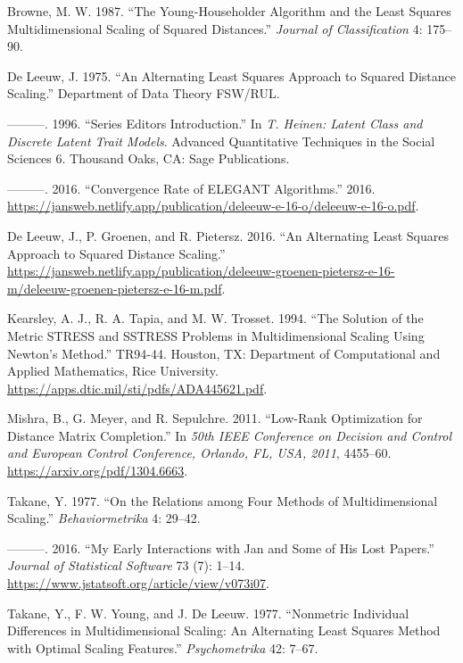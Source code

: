\documentclass[
  12pt,
  letterpaper,
  DIV=11,
  numbers=noendperiod]{scrartcl}
\newlength{\cslhangindent}
\newenvironment{CSLReferences}[2] %
 {\begin{list}{}{%
  \setlength{\itemindent}{0pt}
  \setlength{\leftmargin}{0pt}
  \setlength{\parsep}{0pt}
  \ifodd #1
   \setlength{\leftmargin}{\cslhangindent}
   \setlength{\itemindent}{-1\cslhangindent}
  \fi
  \setlength{\itemsep}{#2\baselineskip}}}
 {\end{list}}
\begin{document}
\label{refs}
\begin{CSLReferences}{1}{0}
Browne, M. W. 1987. {``{The Young-Householder Algorithm and the Least
Squares Multidimensional Scaling of Squared Distances}.''} \emph{Journal
of Classification} 4: 175--90.

De Leeuw, J. 1975. {``{An Alternating Least Squares Approach to Squared
Distance Scaling}.''} Department of Data Theory FSW/RUL.

---------. 1996. {``{Series Editors Introduction}.''} In \emph{{T.
Heinen: Latent Class and Discrete Latent Trait Models}}. Advanced
Quantitative Techniques in the Social Sciences 6. Thousand Oaks, CA:
Sage Publications.

---------. 2016. {``Convergence Rate of {ELEGANT} Algorithms.''} 2016.
\url{https://jansweb.netlify.app/publication/deleeuw-e-16-o/deleeuw-e-16-o.pdf}.

De Leeuw, J., P. Groenen, and R. Pietersz. 2016. {``An Alternating Least
Squares Approach to Squared Distance Scaling.''}
\url{https://jansweb.netlify.app/publication/deleeuw-groenen-pietersz-e-16-m/deleeuw-groenen-pietersz-e-16-m.pdf}.

Kearsley, A. J., R. A. Tapia, and M. W. Trosset. 1994. {``{The Solution
of the Metric STRESS and SSTRESS Problems in Multidimensional Scaling
Using Newton's Method}.''} TR94-44. Houston, TX: {Department of
Computational and Applied Mathematics, Rice University}.
\url{https://apps.dtic.mil/sti/pdfs/ADA445621.pdf}.

Mishra, B., G. Meyer, and R. Sepulchre. 2011. {``Low-Rank Optimization
for Distance Matrix Completion.''} In \emph{50th IEEE Conference on
Decision and Control and European Control Conference, Orlando, FL, USA,
2011}, 4455--60. \url{https://arxiv.org/pdf/1304.6663}.

Takane, Y. 1977. {``{On the Relations among Four Methods of
Multidimensional Scaling}.''} \emph{Behaviormetrika} 4: 29--42.

---------. 2016. {``{My Early Interactions with Jan and Some of His Lost
Papers}.''} \emph{Journal of Statistical Software} 73 (7): 1--14.
\url{https://www.jstatsoft.org/article/view/v073i07}.

Takane, Y., F. W. Young, and J. De Leeuw. 1977. {``Nonmetric Individual
Differences in Multidimensional Scaling: An Alternating Least Squares
Method with Optimal Scaling Features.''} \emph{Psychometrika} 42: 7--67.

\end{CSLReferences}
\end{document}
